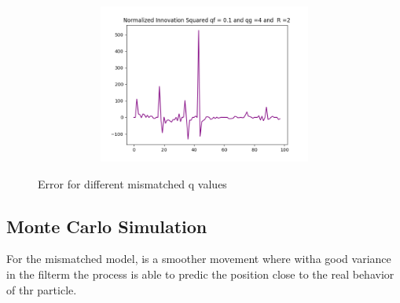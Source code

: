 \documentclass{article}
\begin{document}
\begin{figure}[H]
\begin{subfigure}{1\textwidth}
                \begin{subfigure}{.5\textwidth} 
                    \centering  
                    \includegraphics[width=.5\linewidth]{./img/acc/nis01_qg4_r2.png}
                    \caption{}
                \end{subfigure}
            \end{subfigure}               
            \caption{Error for different mismatched q values}
            \label{fig:accmise}
        \end{figure}

        \subsection{Monte Carlo Simulation}

        For the mismatched model, is a smoother movement where witha good variance in the filterm the process is able to predic the position
        close to the real behavior of thr particle.
\end{document}

